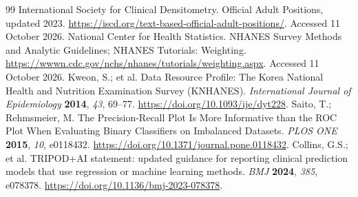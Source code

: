 \documentclass[11pt,a4paper]{article}
\begin{document}
\begin{thebibliography}{99}
 International Society for Clinical Densitometry. Official Adult Positions, updated 2023. \url{https://iscd.org/text-based-official-adult-positions/}. Accessed 11 October 2026.
 National Center for Health Statistics. NHANES Survey Methods and Analytic Guidelines; NHANES Tutorials: Weighting. \url{https://wwwn.cdc.gov/nchs/nhanes/tutorials/weighting.aspx}. Accessed 11 October 2026.
 Kweon, S.; et al. Data Resource Profile: The Korea National Health and Nutrition Examination Survey (KNHANES). \emph{International Journal of Epidemiology} \textbf{2014}, \emph{43}, 69--77. \url{https://doi.org/10.1093/ije/dyt228}.
 Saito, T.; Rehmsmeier, M. The Precision-Recall Plot Is More Informative than the ROC Plot When Evaluating Binary Classifiers on Imbalanced Datasets. \emph{PLOS ONE} \textbf{2015}, \emph{10}, e0118432. \url{https://doi.org/10.1371/journal.pone.0118432}.
 Collins, G.S.; et al. TRIPOD+AI statement: updated guidance for reporting clinical prediction models that use regression or machine learning methods. \emph{BMJ} \textbf{2024}, \emph{385}, e078378. \url{https://doi.org/10.1136/bmj-2023-078378}.
\end{thebibliography}
\end{document}
